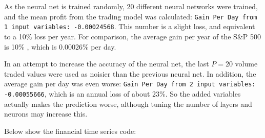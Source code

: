 \documentclass{article}
\begin{document}
\begin{multicols}{2}


As the neural net is trained randomly, 20 different neural networks were trained, and the mean profit from the trading model was calculated: \lstinline|Gain Per Day from 1 input variables: -0.00024568|. This number is a slight loss, and equivalent to a 10\% loss per year. For comparison, the average gain per year of the S\&P 500 is 10\% \cite{averageSnP500Gain}, which is \(0.00026\%\) per day.

In an attempt to increase the accuracy of the neural net, the last \(P = 20\) volume traded values were used as noisier than the previous neural net. In addition, the average gain per day was even worse: \lstinline|Gain Per Day from 2 input variables: -0.00055666|, which is an annual loss of about 23\%. So the added variables actually makes the prediction worse, although tuning the number of layers and neurons may increase this.

Below show the financial time series code:






\end{multicols}
\end{document}
